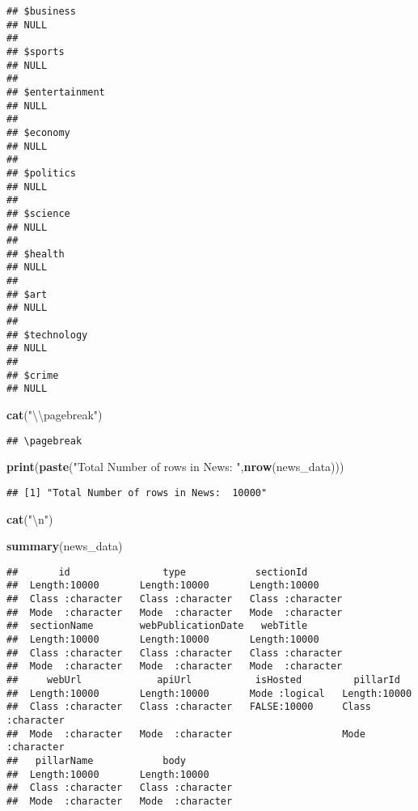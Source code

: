 \documentclass[]{article}
\newenvironment{Shaded}{\begin{snugshade}}{\end{snugshade}}
\newcommand{\KeywordTok}[1]{\textcolor[rgb]{0.13,0.29,0.53}{\textbf{#1}}}
\newcommand{\CharTok}[1]{\textcolor[rgb]{0.31,0.60,0.02}{#1}}
\newcommand{\StringTok}[1]{\textcolor[rgb]{0.31,0.60,0.02}{#1}}
\newcommand{\NormalTok}[1]{#1}
\begin{document}
\begin{verbatim}
## $business
## NULL
## 
## $sports
## NULL
## 
## $entertainment
## NULL
## 
## $economy
## NULL
## 
## $politics
## NULL
## 
## $science
## NULL
## 
## $health
## NULL
## 
## $art
## NULL
## 
## $technology
## NULL
## 
## $crime
## NULL
\end{verbatim}

\begin{Shaded}
\begin{Highlighting}[]
\KeywordTok{cat}\NormalTok{(}\StringTok{"}\CharTok{\textbackslash{}\textbackslash{}}\StringTok{pagebreak"}\NormalTok{)}
\end{Highlighting}
\end{Shaded}

\begin{verbatim}
## \pagebreak
\end{verbatim}

\begin{Shaded}
\begin{Highlighting}[]
\KeywordTok{print}\NormalTok{(}\KeywordTok{paste}\NormalTok{(}\StringTok{"Total Number of rows in News: "}\NormalTok{,}\KeywordTok{nrow}\NormalTok{(news_data)))}
\end{Highlighting}
\end{Shaded}

\begin{verbatim}
## [1] "Total Number of rows in News:  10000"
\end{verbatim}

\begin{Shaded}
\begin{Highlighting}[]
\KeywordTok{cat}\NormalTok{(}\StringTok{"}\CharTok{\textbackslash{}n}\StringTok{"}\NormalTok{)}
\end{Highlighting}
\end{Shaded}

\begin{Shaded}
\begin{Highlighting}[]
\KeywordTok{summary}\NormalTok{(news_data)}
\end{Highlighting}
\end{Shaded}

\begin{verbatim}
##       id                type            sectionId        
##  Length:10000       Length:10000       Length:10000      
##  Class :character   Class :character   Class :character  
##  Mode  :character   Mode  :character   Mode  :character  
##  sectionName        webPublicationDate   webTitle        
##  Length:10000       Length:10000       Length:10000      
##  Class :character   Class :character   Class :character  
##  Mode  :character   Mode  :character   Mode  :character  
##     webUrl             apiUrl           isHosted         pillarId        
##  Length:10000       Length:10000       Mode :logical   Length:10000      
##  Class :character   Class :character   FALSE:10000     Class :character  
##  Mode  :character   Mode  :character                   Mode  :character  
##   pillarName            body          
##  Length:10000       Length:10000      
##  Class :character   Class :character  
##  Mode  :character   Mode  :character
\end{verbatim}
\end{document}
